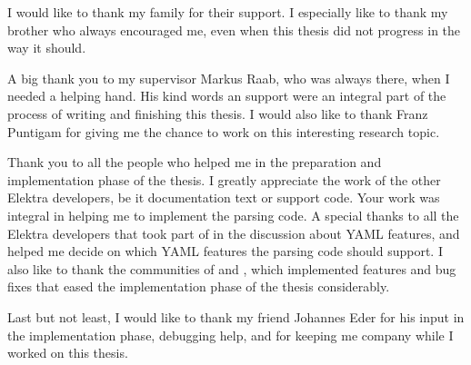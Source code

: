 \begin{acknowledgements*}
I would like to thank my family for their support. I especially like to thank my brother who always encouraged me, even when this thesis did not progress in the way it should.

A big thank you to my supervisor Markus Raab, who was always there, when I needed a helping hand. His kind words an support were an integral part of the process of writing and finishing this thesis. I would also like to thank Franz Puntigam for giving me the chance to work on this interesting research topic.

Thank you to all the people who helped me in the preparation and implementation phase of the thesis. I greatly appreciate the work of the other Elektra developers, be it documentation text or support code. Your work was integral in helping me to implement the parsing code. A special thanks to all the Elektra developers that took part of in the discussion about YAML features, and helped me decide on which YAML features the parsing code should support. I also like to thank the communities of  and , which implemented features and bug fixes that eased the implementation phase of the thesis considerably.

Last but not least, I would like to thank my friend Johannes Eder for his input in the implementation phase, debugging help, and for keeping me company while I worked on this thesis.
\end{acknowledgements*}

